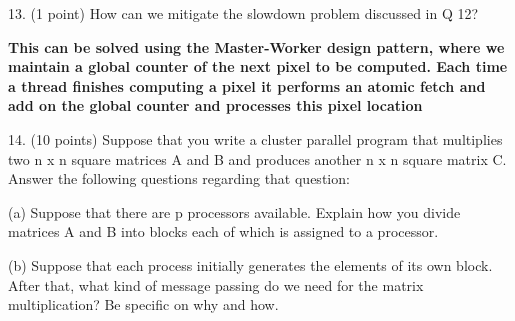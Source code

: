 \documentclass[11pt]{article}
\begin{document}
13. (1 point) How can we mitigate the slowdown problem discussed in Q 12?

{\bf This can be solved using the Master-Worker design pattern, where we maintain a global counter of the next pixel to be computed.  Each time a thread finishes computing a pixel it performs an atomic fetch and add on the global counter and processes this pixel location}

14. (10 points) Suppose that you write a cluster parallel program that multiplies two n x n square matrices A and B and produces another n x n square matrix C. Answer the following questions regarding that question:

(a) Suppose that there are p processors available. Explain how you divide matrices A and B into blocks each of which is assigned to a processor.

(b) Suppose that each process initially generates the elements of its own block. After that, what kind of message passing do we need for the matrix multiplication? Be specific on why and how.
\end{document}
